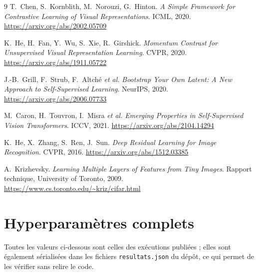 \documentclass[11pt,a4paper]{article}
\begin{document}
\begin{thebibliography}{9}
\small
{}
T.~Chen, S.~Kornblith, M.~Norouzi, G.~Hinton.
\emph{A Simple Framework for Contrastive Learning of Visual Representations}.
ICML, 2020. \url{https://arxiv.org/abs/2002.05709}

K.~He, H.~Fan, Y.~Wu, S.~Xie, R.~Girshick.
\emph{Momentum Contrast for Unsupervised Visual Representation Learning}.
CVPR, 2020. \url{https://arxiv.org/abs/1911.05722}

J.-B.~Grill, F.~Strub, F.~Altché \emph{et al.}
\emph{Bootstrap Your Own Latent: A New Approach to Self-Supervised Learning}.
NeurIPS, 2020. \url{https://arxiv.org/abs/2006.07733}

M.~Caron, H.~Touvron, I.~Misra \emph{et al.}
\emph{Emerging Properties in Self-Supervised Vision Transformers}.
ICCV, 2021. \url{https://arxiv.org/abs/2104.14294}

K.~He, X.~Zhang, S.~Ren, J.~Sun.
\emph{Deep Residual Learning for Image Recognition}.
CVPR, 2016. \url{https://arxiv.org/abs/1512.03385}

A.~Krizhevsky.
\emph{Learning Multiple Layers of Features from Tiny Images}.
Rapport technique, University of Toronto, 2009.
\url{https://www.cs.toronto.edu/~kriz/cifar.html}
\end{thebibliography}


\appendix
\renewcommand{\thesection}{Annexe~\Alph{section}}
\titleformat{\section}{\large\bfseries\color{bleuP}}{\thesection{} ---}{0.5em}{}

\section{Hyperparamètres complets}
\label{ann:hyper}

Toutes les valeurs ci-dessous sont celles des exécutions publiées ; elles sont également
sérialisées dans les fichiers \texttt{resultats.json} du dépôt, ce qui permet de les
vérifier sans relire le code.
\end{document}
